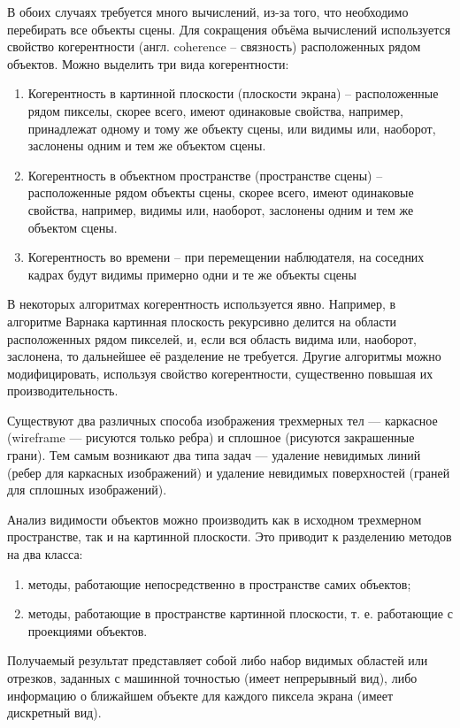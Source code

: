В обоих случаях требуется много вычислений, из-за того, что необходимо перебирать все объекты сцены. Для сокращения объёма вычислений используется свойство когерентности (англ. coherence – связность) расположенных рядом объектов. Можно выделить три вида когерентности:

\begin{enumerate}
	\item Когерентность в картинной плоскости (плоскости экрана) – расположенные рядом пикселы, скорее всего, имеют одинаковые свойства, например, принадлежат одному и тому же объекту сцены, или видимы или, наоборот, заслонены одним и тем же объектом сцены.
	\item Когерентность в объектном пространстве (пространстве сцены) – расположенные рядом объекты сцены, скорее всего, имеют одинаковые свойства, например, видимы или, наоборот, заслонены одним и тем же объектом сцены.
	\item Когерентность во времени – при перемещении наблюдателя, на соседних кадрах будут видимы примерно одни и те же объекты сцены
\end{enumerate}

В некоторых алгоритмах когерентность используется явно. Например, в алгоритме Варнака картинная плоскость рекурсивно делится на области расположенных рядом пикселей, и, если вся область видима или, наоборот, заслонена, то дальнейшее её разделение не требуется. Другие алгоритмы можно модифицировать, используя свойство когерентности, существенно повышая их производительность.~\cite{polski}

Существуют два различных способа изображения трехмерных тел — каркасное (wireframe — рисуются только ребра) и сплошное (рисуются закрашенные грани). Тем самым возникают два типа задач — удаление невидимых линий (ребер для каркасных изображений) и удаление невидимых поверхностей (граней для сплошных изображений).

Анализ видимости объектов можно производить как в исходном трехмерном пространстве, так и на картинной плоскости. Это приводит к разделению методов на два класса:

\begin{enumerate}
    \item методы, работающие непосредственно в пространстве самих объектов;
    \item методы, работающие в пространстве картинной плоскости, т. е. работающие с проекциями объектов.
\end{enumerate}

Получаемый результат представляет собой либо набор видимых областей или отрезков, заданных с машинной точностью (имеет непрерывный вид), либо информацию о ближайшем объекте для каждого пиксела экрана (имеет дискретный вид).

